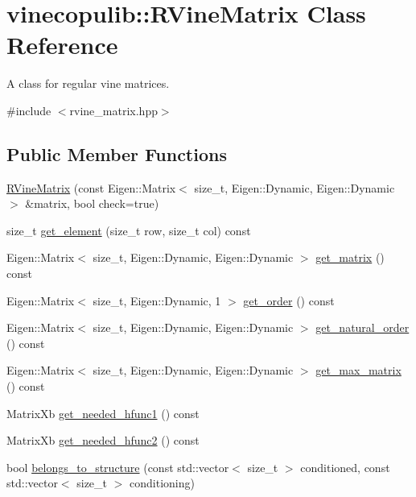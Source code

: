 \hypertarget{classvinecopulib_1_1_r_vine_matrix}{}\section{vinecopulib\+:\+:R\+Vine\+Matrix Class Reference}
\label{classvinecopulib_1_1_r_vine_matrix}


A class for regular vine matrices.  




{\ttfamily \#include $<$rvine\+\_\+matrix.\+hpp$>$}

\subsection*{Public Member Functions}
\begin{DoxyCompactItemize}
\item 
\hyperlink{classvinecopulib_1_1_r_vine_matrix_a966316e211937ae11e840ef7540a492f}{R\+Vine\+Matrix} (const Eigen\+::\+Matrix$<$ size\+\_\+t, Eigen\+::\+Dynamic, Eigen\+::\+Dynamic $>$ \&matrix, bool check=true)
\item 
size\+\_\+t \hyperlink{classvinecopulib_1_1_r_vine_matrix_a873a94d9065ec4e70f43245c5841741b}{get\+\_\+element} (size\+\_\+t row, size\+\_\+t col) const 
\item 
Eigen\+::\+Matrix$<$ size\+\_\+t, Eigen\+::\+Dynamic, Eigen\+::\+Dynamic $>$ \hyperlink{classvinecopulib_1_1_r_vine_matrix_a37c79233fca1e56e1535cbb37f8d3177}{get\+\_\+matrix} () const 
\item 
Eigen\+::\+Matrix$<$ size\+\_\+t, Eigen\+::\+Dynamic, 1 $>$ \hyperlink{classvinecopulib_1_1_r_vine_matrix_a71554c734c3cbb4c066c1f17fe94a284}{get\+\_\+order} () const 
\item 
Eigen\+::\+Matrix$<$ size\+\_\+t, Eigen\+::\+Dynamic, Eigen\+::\+Dynamic $>$ \hyperlink{classvinecopulib_1_1_r_vine_matrix_a181177080ec418e66931e01160f05f54}{get\+\_\+natural\+\_\+order} () const 
\item 
Eigen\+::\+Matrix$<$ size\+\_\+t, Eigen\+::\+Dynamic, Eigen\+::\+Dynamic $>$ \hyperlink{classvinecopulib_1_1_r_vine_matrix_aef8bbe14451d023e1c9c113e3812f574}{get\+\_\+max\+\_\+matrix} () const 
\item 
Matrix\+Xb \hyperlink{classvinecopulib_1_1_r_vine_matrix_a6303fc1f643fdf793c867ca7e08e42bc}{get\+\_\+needed\+\_\+hfunc1} () const 
\item 
Matrix\+Xb \hyperlink{classvinecopulib_1_1_r_vine_matrix_a7ac32cf10a966ba567142e9b36106746}{get\+\_\+needed\+\_\+hfunc2} () const 
\item 
bool \hyperlink{classvinecopulib_1_1_r_vine_matrix_a9ac94374329ca2cfee92ce676c7f1c2a}{belongs\+\_\+to\+\_\+structure} (const std\+::vector$<$ size\+\_\+t $>$ conditioned, const std\+::vector$<$ size\+\_\+t $>$ conditioning)
\end{DoxyCompactItemize}
